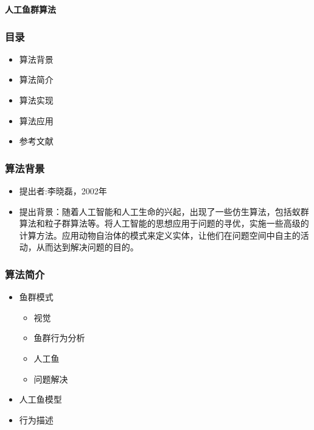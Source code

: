 
\begin{frame}
\newcommand{\song}{\setCJKfamilyfont{song}}
\newcommand{\xiaoer}{\fontsize{18pt}{18pt}\selectfont}
	\begin{center}
	{\song\xiaoer\textbf{人工鱼群算法}}
	\end{center}
\end{frame}

\begin{frame}
	\frametitle{目录}
	\begin{itemize}
		\item{算法背景}
		\item{算法简介}
		\item{算法实现}
		\item{算法应用}
		\item{参考文献}
	\end{itemize}
\end{frame}

\begin{frame}
	\frametitle{算法背景}
	\begin{itemize}
		\item{提出者:李晓磊，2002年}
		\item{提出背景：随着人工智能和人工生命的兴起，出现了一些仿生算法，包括蚁群算法和粒子群算法等。将人工智能的思想应用于问题的寻优，实施一些高级的计算方法。应用动物自治体的模式来定义实体，让他们在问题空间中自主的活动，从而达到解决问题的目的。}
	\end{itemize}
\end{frame}

\begin{frame}
	\frametitle{算法简介}
	\begin{itemize}
		\item{鱼群模式}
			\begin{itemize}
				\item{视觉}
				\item{鱼群行为分析}
				\item{人工鱼}
				\item{问题解决}
			\end{itemize}
		\item{人工鱼模型}
		\item{行为描述}
	\end{itemize}
\end{frame}

